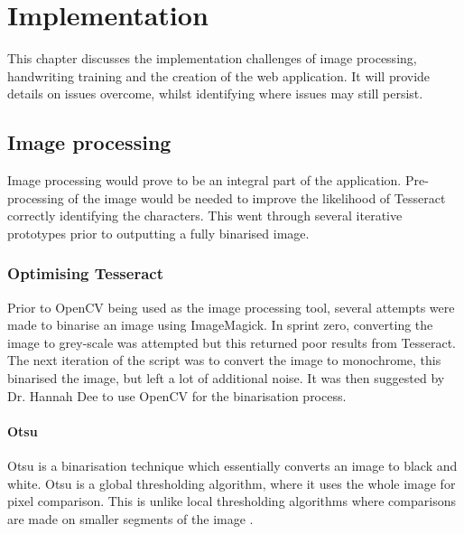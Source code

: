\chapter{Implementation}



This chapter discusses the implementation challenges of image processing, handwriting training and the creation of the web application. It will provide details on issues overcome, whilst identifying where issues may still persist.
\section{Image processing} \label{imp:image_proces}
Image processing would prove to be an integral part of the application. Pre-processing of the image would be needed to improve the likelihood of Tesseract correctly identifying the characters. This went through several iterative prototypes prior to outputting a fully binarised image.
\subsection{Optimising Tesseract}
Prior to OpenCV being used as the image processing tool, several attempts were made to binarise an image using ImageMagick. In sprint zero, converting the image to grey-scale was attempted but this returned poor results from Tesseract. The next iteration of the script was to convert the image to monochrome, this binarised the image, but left a lot of additional noise. It was then suggested by Dr. Hannah Dee to use OpenCV for the binarisation process.

\subsubsection{Otsu}
Otsu \cite{citeulike:2917492} is a binarisation technique which essentially converts an image to black and white. Otsu is a global thresholding algorithm, where it uses the whole image for pixel comparison. This is unlike local thresholding algorithms where comparisons are made on smaller segments of the image \cite{citeulike:6044081}.

